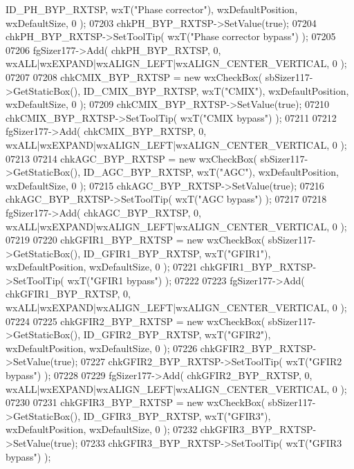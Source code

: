 \begin{DoxyCode}
      ID_PH_BYP_RXTSP, wxT(\textcolor{stringliteral}{"Phase corrector"}), wxDefaultPosition, wxDefaultSize, 0 );
07203     chkPH_BYP_RXTSP->SetValue(\textcolor{keyword}{true}); 
07204     chkPH_BYP_RXTSP->SetToolTip( wxT(\textcolor{stringliteral}{"Phase corrector bypass"}) );
07205     
07206     fgSizer177->Add( chkPH_BYP_RXTSP, 0, wxALL|wxEXPAND|wxALIGN\_LEFT|wxALIGN\_CENTER\_VERTICAL, 0 );
07207     
07208     chkCMIX_BYP_RXTSP = \textcolor{keyword}{new} wxCheckBox( sbSizer117->GetStaticBox(), 
      ID_CMIX_BYP_RXTSP, wxT(\textcolor{stringliteral}{"CMIX"}), wxDefaultPosition, wxDefaultSize, 0 );
07209     chkCMIX_BYP_RXTSP->SetValue(\textcolor{keyword}{true}); 
07210     chkCMIX_BYP_RXTSP->SetToolTip( wxT(\textcolor{stringliteral}{"CMIX bypass"}) );
07211     
07212     fgSizer177->Add( chkCMIX_BYP_RXTSP, 0, wxALL|wxEXPAND|wxALIGN\_LEFT|wxALIGN\_CENTER\_VERTICAL, 0 );
07213     
07214     chkAGC_BYP_RXTSP = \textcolor{keyword}{new} wxCheckBox( sbSizer117->GetStaticBox(), 
      ID_AGC_BYP_RXTSP, wxT(\textcolor{stringliteral}{"AGC"}), wxDefaultPosition, wxDefaultSize, 0 );
07215     chkAGC_BYP_RXTSP->SetValue(\textcolor{keyword}{true}); 
07216     chkAGC_BYP_RXTSP->SetToolTip( wxT(\textcolor{stringliteral}{"AGC bypass"}) );
07217     
07218     fgSizer177->Add( chkAGC_BYP_RXTSP, 0, wxALL|wxEXPAND|wxALIGN\_LEFT|wxALIGN\_CENTER\_VERTICAL, 0 );
07219     
07220     chkGFIR1_BYP_RXTSP = \textcolor{keyword}{new} wxCheckBox( sbSizer117->GetStaticBox(), 
      ID_GFIR1_BYP_RXTSP, wxT(\textcolor{stringliteral}{"GFIR1"}), wxDefaultPosition, wxDefaultSize, 0 );
07221     chkGFIR1_BYP_RXTSP->SetToolTip( wxT(\textcolor{stringliteral}{"GFIR1 bypass"}) );
07222     
07223     fgSizer177->Add( chkGFIR1_BYP_RXTSP, 0, wxALL|wxEXPAND|wxALIGN\_LEFT|wxALIGN\_CENTER\_VERTICAL, 0 );
07224     
07225     chkGFIR2_BYP_RXTSP = \textcolor{keyword}{new} wxCheckBox( sbSizer117->GetStaticBox(), 
      ID_GFIR2_BYP_RXTSP, wxT(\textcolor{stringliteral}{"GFIR2"}), wxDefaultPosition, wxDefaultSize, 0 );
07226     chkGFIR2_BYP_RXTSP->SetValue(\textcolor{keyword}{true}); 
07227     chkGFIR2_BYP_RXTSP->SetToolTip( wxT(\textcolor{stringliteral}{"GFIR2 bypass"}) );
07228     
07229     fgSizer177->Add( chkGFIR2_BYP_RXTSP, 0, wxALL|wxEXPAND|wxALIGN\_LEFT|wxALIGN\_CENTER\_VERTICAL, 0 );
07230     
07231     chkGFIR3_BYP_RXTSP = \textcolor{keyword}{new} wxCheckBox( sbSizer117->GetStaticBox(), 
      ID_GFIR3_BYP_RXTSP, wxT(\textcolor{stringliteral}{"GFIR3"}), wxDefaultPosition, wxDefaultSize, 0 );
07232     chkGFIR3_BYP_RXTSP->SetValue(\textcolor{keyword}{true}); 
07233     chkGFIR3_BYP_RXTSP->SetToolTip( wxT(\textcolor{stringliteral}{"GFIR3 bypass"}) );

\end{DoxyCode}

